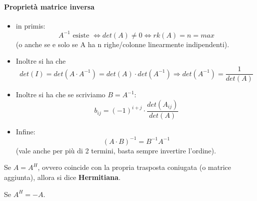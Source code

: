 \documentclass[12pt,a4paper,]{report}
\begin{document}
\paragraph{Proprietà matrice inversa}
\begin{itemize}
    \item in primis:
    \[
    \boxed{A^{-1} \text{ esiste } \Longleftrightarrow det(A) \neq 0 \Longleftrightarrow rk(A) = n = max}
    \]
    (o anche se e solo se A ha n righe/colonne linearmente indipendenti).
    \item Inoltre si ha che 
    \[
    det(I) = det(A\cdot A^{-1}) = det(A)\cdot det(A^{-1}) \Longrightarrow \boxed{det(A^{-1}) = \frac{1}{det(A)}}
    \]
    \item Inoltre si ha che se scriviamo $B = A^{-1}$:
    \[
    b_{ij} = (-1)^{i+j} \cdot \frac{det(A_{ij})}{det(A)}
    \]
    \item Infine:
    \[
    (A\cdot B)^{-1} = B^{-1}A^{-1} 
    \]
    (vale anche per più di 2 termini, basta sempre invertire l'ordine).
\end{itemize}

\begin{definizione}
    Se $A = A^H$, ovvero coincide con la propria trasposta coniugata (o matrice aggiunta), allora si dice \textbf{Hermitiana}.
\end{definizione}
\begin{definizione}
    Se $A^H = -A$.
\end{definizione}
\end{document}
